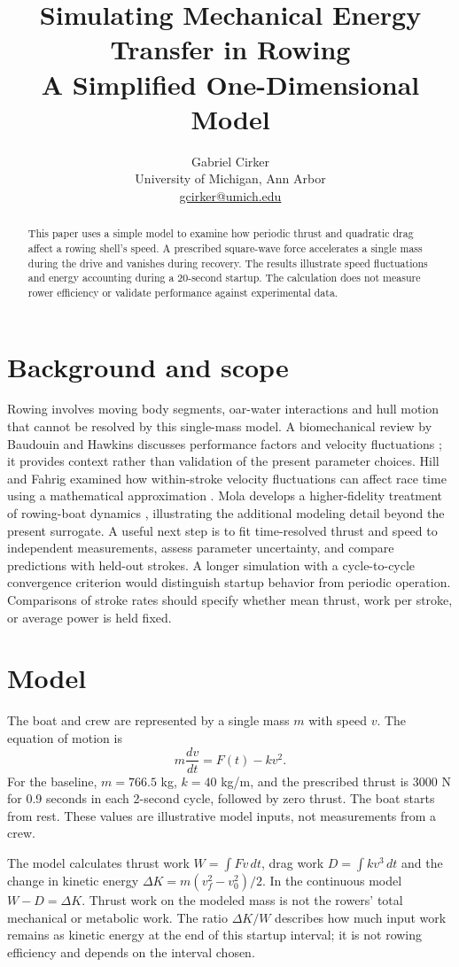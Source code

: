 \documentclass[11pt]{article}
\title{Simulating Mechanical Energy Transfer in Rowing\\\large A Simplified One-Dimensional Model}
\author{Gabriel Cirker\\\small University of Michigan, Ann Arbor\\\small \href{mailto:gcirker@umich.edu}{gcirker@umich.edu}}
\date{}
\begin{document}
\maketitle
\begin{abstract}
This paper uses a simple model to examine how periodic thrust and quadratic drag affect a rowing shell's speed. A prescribed square-wave force accelerates a single mass during the drive and vanishes during recovery. The results illustrate speed fluctuations and energy accounting during a 20-second startup. The calculation does not measure rower efficiency or validate performance against experimental data.
\end{abstract}
\section{Background and scope}
Rowing involves moving body segments, oar-water interactions and hull motion that cannot be resolved by this single-mass model. A biomechanical review by Baudouin and Hawkins discusses performance factors and velocity fluctuations \cite{baudouin}; it provides context rather than validation of the present parameter choices. Hill and Fahrig examined how within-stroke velocity fluctuations can affect race time using a mathematical approximation \cite{hill}. Mola develops a higher-fidelity treatment of rowing-boat dynamics \cite{mola}, illustrating the additional modeling detail beyond the present surrogate. A useful next step is to fit time-resolved thrust and speed to independent measurements, assess parameter uncertainty, and compare predictions with held-out strokes. A longer simulation with a cycle-to-cycle convergence criterion would distinguish startup behavior from periodic operation. Comparisons of stroke rates should specify whether mean thrust, work per stroke, or average power is held fixed.
\section{Model}
The boat and crew are represented by a single mass $m$ with speed $v$. The equation of motion is
\begin{equation}m\frac{dv}{dt}=F(t)-kv^2.\end{equation}
For the baseline, $m=766.5$ kg, $k=40$ kg/m, and the prescribed thrust is 3000 N for 0.9 seconds in each 2-second cycle, followed by zero thrust. The boat starts from rest. These values are illustrative model inputs, not measurements from a crew.

The model calculates thrust work $W=\int Fv\,dt$, drag work $D=\int kv^3\,dt$ and the change in kinetic energy $\Delta K=m(v_f^2-v_0^2)/2$. In the continuous model $W-D=\Delta K$. Thrust work on the modeled mass is not the rowers' total mechanical or metabolic work. The ratio $\Delta K/W$ describes how much input work remains as kinetic energy at the end of this startup interval; it is not rowing efficiency and depends on the interval chosen.
\end{document}
